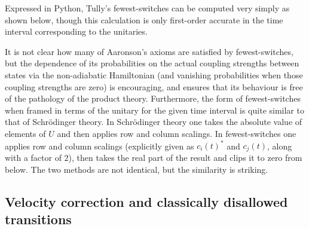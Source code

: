 Expressed in Python, Tully's fewest-switches can be computed very simply as shown below, though this calculation is only first-order accurate in the time interval corresponding to the unitaries.


It is not clear how many of Aaronson's axioms are satisfied by fewest-switches, but the dependence of its probabilities on the actual coupling strengths between states via the non-adiabatic Hamiltonian (and vanishing probabilities when those coupling strengths are zero) is encouraging, and ensures that its behaviour is free of the pathology of the product theory. Furthermore, the form of fewest-switches when framed in terms of the unitary for the given time interval is quite similar to that of Schr\"odinger theory. In Schr\"odinger theory one takes the absolute value of elements of $U$ and then applies row and column scalings. In fewest-switches one applies row and column scalings (explicitly given as $c_i(t)^*$ and $c_j(t)$, along with a factor of $2$), then takes the real part of the result and clips it to zero from below. The two methods are not identical, but the similarity is striking.

\subsection{Velocity correction and classically disallowed transitions}\label{sec:velocity_correction}

